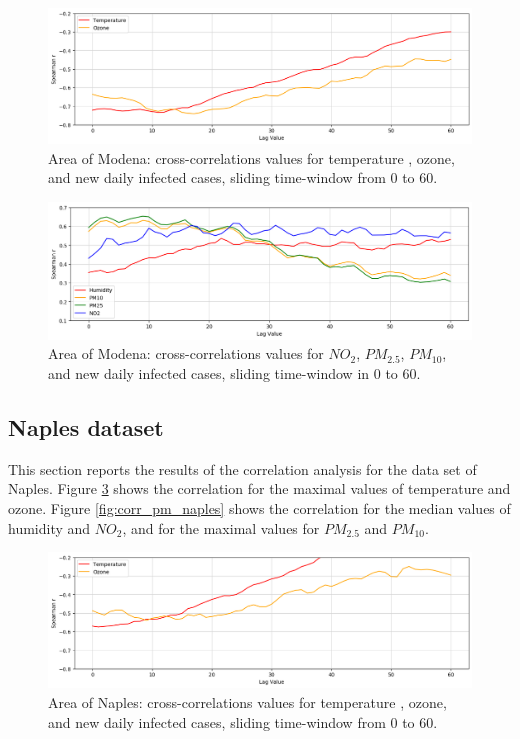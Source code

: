 \documentclass[review]{elsarticle}
\begin{document}
\begin{figure}[htp] 	\centering 	\includegraphics[width=1\linewidth]{img/corr_temp_modena.png} 	\caption{Area of Modena: cross-correlations values for temperature 
, ozone, 
 and new daily infected cases, sliding time-window from $0$ to $60$.} 	\label{fig:corr_modena} \end{figure} 
 \begin{figure}[htp]	\centering	\includegraphics[width=1\linewidth]{img/corr_pm_modena.png}	\caption{Area of Modena: cross-correlations values for $NO_{2}$, $PM_{2.5}$, $PM_{10}$, and new daily infected cases, sliding time-window in $0$ to $60$.}	\label{fig:corr_pm_modena} \end{figure}
\newpage \subsection{Naples dataset}
This section reports the results of the correlation analysis for the data set of Naples. 		Figure \ref{fig:corr_naples} shows the correlation for the maximal values of temperature 
 and ozone.
	Figure \ref{fig:corr_pm_naples} shows the correlation for the median values of humidity and $NO_{2}$, and for the 		maximal values for $PM_{2.5}$ and $PM_{10}$.
\begin{figure}[htp] 	\centering 	\includegraphics[width=1\linewidth]{img/corr_temp_naples.png} 	\caption{Area of Naples: cross-correlations values for temperature 
, ozone, 
 and new daily infected cases, sliding time-window from $0$ to $60$.} 	\label{fig:corr_naples} \end{figure} 
\end{document}
